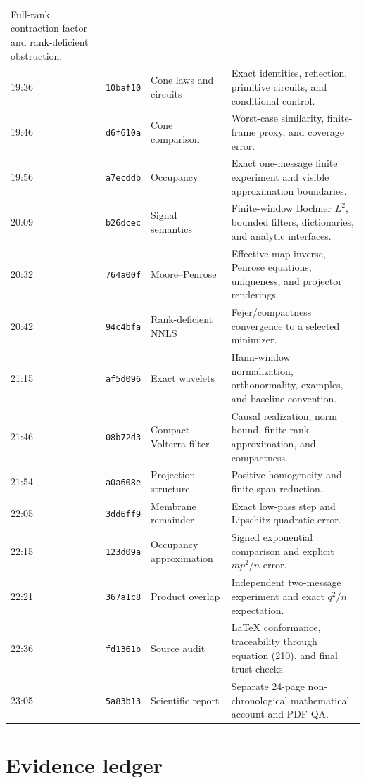 \documentclass[11pt,a4paper]{article}
\newcommand{\commit}[1]{\texttt{#1}}
\begin{document}
\begin{longtable}{@{}C{13mm}L{17mm}L{39mm}L{72mm}@{}}
Full-rank contraction factor and rank-deficient obstruction. \\
19:36 & \commit{10baf10} & Cone laws and circuits &
Exact identities, reflection, primitive circuits, and conditional control. \\
19:46 & \commit{d6f610a} & Cone comparison &
Worst-case similarity, finite-frame proxy, and coverage error. \\
19:56 & \commit{a7ecddb} & Occupancy &
Exact one-message finite experiment and visible approximation boundaries. \\
20:09 & \commit{b26dcec} & Signal semantics &
Finite-window Bochner \(L^2\), bounded filters, dictionaries, and analytic
interfaces. \\
20:32 & \commit{764a00f} & Moore--Penrose &
Effective-map inverse, Penrose equations, uniqueness, and projector renderings. \\
20:42 & \commit{94c4bfa} & Rank-deficient NNLS &
Fejer/compactness convergence to a selected minimizer. \\
21:15 & \commit{af5d096} & Exact wavelets &
Hann-window normalization, orthonormality, examples, and baseline convention. \\
21:46 & \commit{08b72d3} & Compact Volterra filter &
Causal realization, norm bound, finite-rank approximation, and compactness. \\
21:54 & \commit{a0a608e} & Projection structure &
Positive homogeneity and finite-span reduction. \\
22:05 & \commit{3dd6ff9} & Membrane remainder &
Exact low-pass step and Lipschitz quadratic error. \\
22:15 & \commit{123d09a} & Occupancy approximation &
Signed exponential comparison and explicit \(mp^2/n\) error. \\
22:21 & \commit{367a1c8} & Product overlap &
Independent two-message experiment and exact \(q^2/n\) expectation. \\
22:36 & \commit{fd1361b} & Source audit &
LaTeX conformance, traceability through equation (210), and final trust checks. \\
23:05 & \commit{5a83b13} & Scientific report &
Separate 24-page non-chronological mathematical account and PDF QA. \\
\bottomrule
\end{longtable}

\section{Evidence ledger}
\label{app:evidence-ledger}
\end{document}
